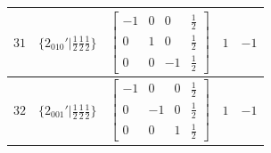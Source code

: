 \documentclass[fleqn,8pt]{jsarticle}
\begin{document}
\begin{longtable}{ccccc}
$ 31 $ & $ \{2{}_{010}{}'|\frac{1}{2} \frac{1}{2} \frac{1}{2}\} $ & $ \begin{bmatrix} -1 & 0 & 0 & \frac{1}{2} \\ 0 & 1 & 0 & \frac{1}{2} \\ 0 & 0 & -1 & \frac{1}{2} \end{bmatrix} $ & $ 1 $ & $ -1 $ \\ \hline
$ 32 $ & $ \{2{}_{001}{}'|\frac{1}{2} \frac{1}{2} \frac{1}{2}\} $ & $ \begin{bmatrix} -1 & 0 & 0 & \frac{1}{2} \\ 0 & -1 & 0 & \frac{1}{2} \\ 0 & 0 & 1 & \frac{1}{2} \end{bmatrix} $ & $ 1 $ & $ -1 $ \\
\end{longtable}
\end{document}
